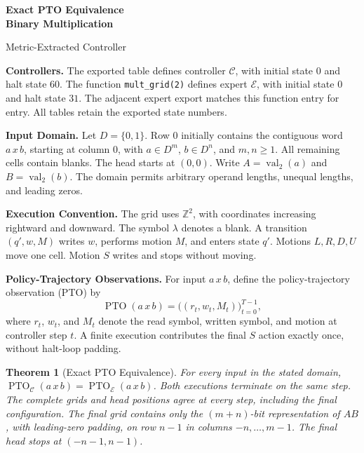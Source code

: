 \documentclass[11pt,a4paper]{article}
\date{}
\newcommand{\blank}{\lambda}
\newcommand{\digits}{\{0,1\}}
\newcommand{\EXPERT}{\mathcal E}
\newcommand{\CTRL}{\mathcal C}
\newcommand{\PTO}{\operatorname{PTO}}
\newcommand{\code}[1]{\texttt{#1}}
\newtheorem{theorem}{Theorem}
\newcommand{\sectiontitle}[2]{\refstepcounter{section}\vspace*{2pt}{\LARGE\bfseries\color{Teal}\thesection\quad #2}\par\vspace{7pt}}
\begin{document}
{\Huge\bfseries Exact PTO Equivalence\\[3pt]Binary Multiplication}\par
\vspace{10pt}
{\Large Metric-Extracted Controller}\par
{\small\color{Muted}}\par
\vspace{7pt}

\vspace{4pt}
\sectiontitle{1 \enspace STATEMENT AND SCOPE}{Statement and Scope}\label{sec:common1}
\textbf{Controllers.}
The exported table  defines controller
$\CTRL$, with initial state $0$ and halt state $60$.
The function \code{mult\_grid(2)} defines expert $\EXPERT$, with initial
state $0$ and halt state $31$. The adjacent expert export matches
this function entry for entry. All tables retain the exported state numbers.

\textbf{Input Domain.}
Let $D=\digits$. Row $0$ initially contains the contiguous word $a\,x\,b$,
starting at column $0$, with $a\in D^m$, $b\in D^n$, and $m,n\ge1$.
All remaining cells contain blanks. The head starts at $(0,0)$.
Write $A=\operatorname{val}_{2}(a)$ and $B=\operatorname{val}_{2}(b)$.
The domain permits arbitrary operand lengths, unequal lengths, and leading zeros.

\textbf{Execution Convention.}
The grid uses $\mathbb Z^2$, with coordinates increasing rightward and
downward. The symbol $\blank$ denotes a blank. A transition
$(q',w,M)$ writes $w$, performs motion $M$, and enters state $q'$.
Motions $L,R,D,U$ move one cell. Motion $S$ writes and stops without moving.

\textbf{Policy-Trajectory Observations.}
For input $a\,x\,b$, define the policy-trajectory observation (PTO) by
\[
\PTO(a\,x\,b)=\bigl((r_t,w_t,M_t)\bigr)_{t=0}^{T-1},
\]
where $r_t$, $w_t$, and $M_t$ denote the read symbol, written symbol,
and motion at controller step $t$. A finite execution contributes the final
$S$ action exactly once, without halt-loop padding.

\begin{theorem}[Exact PTO Equivalence]\label{thm:main}
For every input in the stated domain,
$\PTO_{\CTRL}(a\,x\,b)=\PTO_{\EXPERT}(a\,x\,b)$.
Both executions terminate on the same step. The complete grids and head
positions agree at every step, including the final configuration.
The final grid contains only the $(m+n)$-bit representation of $AB$,
with leading-zero padding, on row $n-1$ in columns $-n,\ldots,m-1$.
The final head stops at $(-n-1,n-1)$.
\end{theorem}
\end{document}
